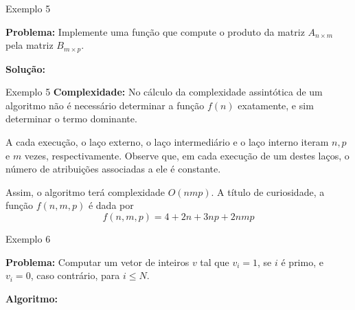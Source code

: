 \begin{frame}[fragile]{Exemplo 5}

	{\bf Problema:} Implemente uma função que compute o produto da matriz $A_{n\times m}$ pela
        matriz $B_{m\times p}$.

	\vspace{0.1in}

    {\bf Solução:} 
    \vspace{0.2in}
    
\end{frame}

\begin{frame}[fragile]{Exemplo 5}
	{\bf Complexidade:} No cálculo da complexidade assintótica de um algoritmo não é necessário
    determinar a função $f(n)$ exatamente, e sim determinar o termo dominante.

    A cada execução, o laço externo, o laço intermediário e o laço interno iteram $n, p$ e $m$ 
    vezes, respectivamente. Observe que, em cada execução de um destes laços, o número de 
    atribuições associadas a ele é constante.

    Assim, o algoritmo terá complexidade $O(nmp)$. A título de curiosidade, a função $f(n, m, p)$
    é dada por
    \[
        f(n, m, p) = 4 + 2n + 3np + 2nmp
    \]

\end{frame}

\begin{frame}[fragile]{Exemplo 6}

	{\bf Problema:} Computar um vetor de inteiros $v$ tal que $v_i = 1$, se $i$ é primo, e
        $v_i = 0$, caso contrário, para $i \leq N$.

	\vspace{0.1in}

    {\bf Algoritmo:} 

	\vspace{0.2in}
\end{frame}

